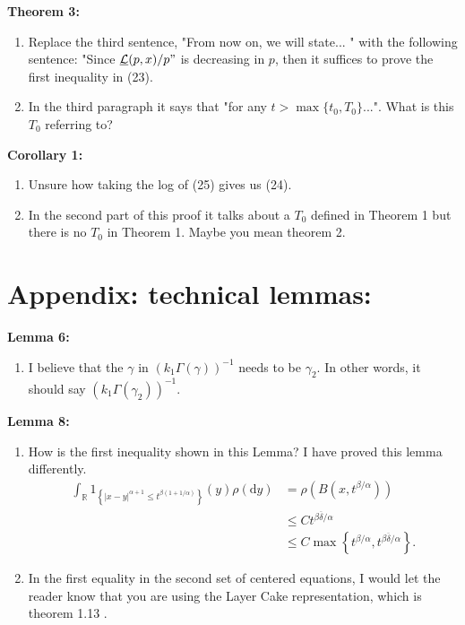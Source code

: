 \documentclass[a4paper,11pt]{article}
\numberwithin{equation}{section}
\numberwithin{equation}{section}
\theoremstyle{plain}
\theoremstyle{definition}
\newcommand{\ud}{\ensuremath{\mathrm{d} }}
\newcommand{\R}{\mathbb{R}}
\begin{document}
\textbf{Theorem 3:}
\begin{enumerate}
	\item 
Replace the third sentence, "From now on, we will state... " with the following sentence: "Since $\underline{\mathcal{L}}(p,x)/p"$ is decreasing in $p$, then it suffices to prove the first inequality in (23). 

	\item 
In the third paragraph it says that "for any $t > \max\{t_0,T_0\}$...". What is this $T_0$ referring to? 
\end{enumerate}

\textbf{Corollary 1:}
\begin{enumerate}
	\item 
Unsure how taking the log of (25) gives us (24).

	\item 
In the second part of this proof it talks about a $T_0$ defined in Theorem 1 but there is no $T_0$ in Theorem 1. Maybe you mean theorem 2. 
\end{enumerate}

\section{Appendix: technical lemmas:}

\textbf{Lemma 6:}
	\begin{enumerate}
		\item
I believe that the $\gamma$ in $(k_1\Gamma(\gamma))^{-1}$ needs to be $\gamma_2$. In other words, it should say $(k_1\Gamma(\gamma_2))^{-1}$.
\end{enumerate}

\textbf{Lemma 8:}
\begin{enumerate}
	\item 
How is the first inequality shown in this Lemma? I have proved this lemma differently.
	\begin{align*}
	\int_{\R} 1_{\left\{ |x-y|^{\alpha+1} \le t^{\beta(1+1/\alpha)} \right\} } (y) \rho(\ud y) &= \rho\left( B(x,t^{\beta/\alpha}) \right)
	\\& \le C t^{\beta\overline{\delta}/\alpha}
	\\& \le C \max\left\{ t^{\beta/\alpha}, t^{\beta\overline{\delta}/\alpha} \right\}.
	\end{align*}

	\item
In the first equality in the second set of centered equations, I would let the reader know that you are using the Layer Cake representation, which is theorem 1.13 \cite{LiebLoss01}. 
\end{enumerate}
\end{document}

